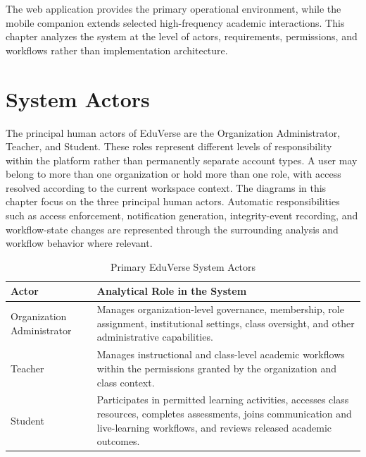 The web application provides the primary operational environment, while the
mobile companion extends selected high-frequency academic interactions. This
chapter analyzes the system at the level of actors, requirements, permissions,
and workflows rather than implementation architecture.

\section{System Actors}\label{sec:system_actors}

The principal human actors of EduVerse are the Organization Administrator,
Teacher, and Student. These roles represent different levels of responsibility
within the platform rather than permanently separate account types. A user may
belong to more than one organization or hold more than one role, with access
resolved according to the current workspace context.
The diagrams in this chapter focus on the three principal human actors.
Automatic responsibilities such as access enforcement, notification generation,
integrity-event recording, and workflow-state changes are represented through
the surrounding analysis and workflow behavior where relevant.

\begin{table}[htbp]
  \centering
  \small
  \renewcommand{\arraystretch}{1.15}
  \setlength{\tabcolsep}{5pt}
  \caption{Primary EduVerse System Actors}
  \label{tab:eduverse_system_actors}
  \begin{tabular}{|p{}|p{}|}
    \hline
    \textbf{Actor} & \textbf{Analytical Role in the System} \\
    \hline
    Organization Administrator & Manages organization-level governance, membership, role assignment, institutional settings, class oversight, and other administrative capabilities. \\
    \hline
    Teacher & Manages instructional and class-level academic workflows within the permissions granted by the organization and class context. \\
    \hline
    Student & Participates in permitted learning activities, accesses class resources, completes assessments, joins communication and live-learning workflows, and reviews released academic outcomes. \\
    \hline
  \end{tabular}
\end{table}



